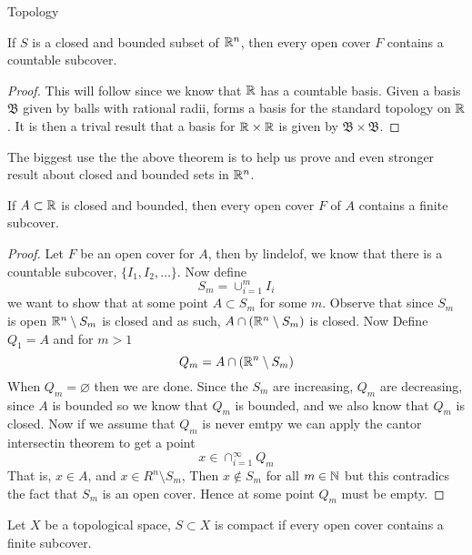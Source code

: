 \begin{chapter}{Topology}
    \begin{thm}
        If $S$ is a closed and bounded subset of $\mathbb{R}^n$, then every open cover $F$ contains a countable subcover. 
    \end{thm}  

    \begin{proof}
	    This will follow since we know that $\mathbb{R}$ has a countable basis. Given a basis $\mathfrak{B}$ given by balls 
	    with rational radii, forms a basis for the standard topology on $\mathbb{R}$. It is then a trival result that a basis for $\mathbb{R} \times \mathbb{R}$ is given by $\mathfrak{B} \times \mathfrak{B}$. 
    \end{proof}

    The biggest use the the above theorem is to help us prove and even stronger result about closed and bounded sets in $\mathbb{R}^n$.

    \begin{thm}
        If $A \subset \mathbb{R}$ is closed and bounded, then every open cover $F$ of $A$ contains 
        a finite subcover. 
    \end{thm}

    \begin{proof}
        Let $F$ be an open cover for $A$, then by lindelof, we know that there is a countable subcover, 
        $\{I_1, I_2, \dots \}$. Now define 
        \[S_m  = \cup_{i = 1}^m I_i\]
        we want to show that at some point $A \subset S_m$ for some $m$. Observe that since $S_m$ is open 
        $\mathbb{R}^n \setminus S_m$ is closed and as such, $A \cap (\mathbb{R}^n \setminus S_m)$ is closed. Now Define $Q_1 = A$ and for $m > 1$ 
        \[Q_m = A \cap (\mathbb{R}^n \setminus S_m)\]
        When $Q_m = \varnothing $ then we are done. Since the $S_m$ are increasing, $Q_m$ are decreasing, since $A$ is bounded so we know that $Q_m$ is bounded, and 
        we also know that $Q_m$ is closed. Now if we assume that $Q_m$ is never emtpy we can apply the cantor intersectin theorem to get a point 
        \[x \in \cap_{i = 1}^\infty Q_m\]
        That is, $x \in A$, and $x \in R^n \setminus S_m$, Then $x \notin S_m$ for all $m \in \mathbb{N}$ but this contradics the fact that $S_m$ is an open cover. 
        Hence at some point $Q_m$ must be empty. 
    \end{proof}

    \begin{defn}
        Let $X$ be a topological space, $S \subset X$ is compact if every open cover contains a finite subcover.
    \end{defn}


\end{chapter}
